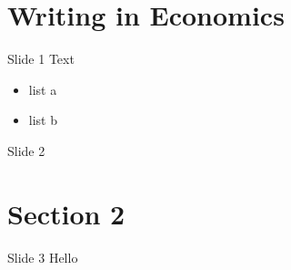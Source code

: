 \documentclass{beamer}
\begin{document}
\section{Writing in Economics}

\begin{frame}{Slide 1}
Text

\begin{itemize}
\tightlist
\item
  list a
\item
  list b
\end{itemize}
\end{frame}

\begin{frame}{Slide 2}
\end{frame}

\section{Section 2}

\begin{frame}{Slide 3}
Hello
\end{frame}
\end{document}
